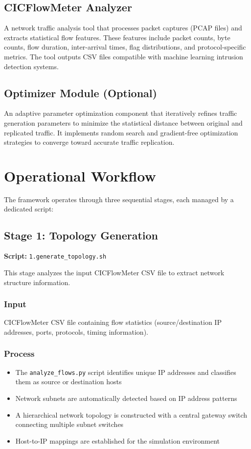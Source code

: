 \documentclass[11pt,a4paper]{article}
\begin{document}
\subsection{CICFlowMeter Analyzer}

A network traffic analysis tool that processes packet captures (PCAP files) and extracts statistical flow features. These features include packet counts, byte counts, flow duration, inter-arrival times, flag distributions, and protocol-specific metrics. The tool outputs CSV files compatible with machine learning intrusion detection systems.

\subsection{Optimizer Module (Optional)}

An adaptive parameter optimization component that iteratively refines traffic generation parameters to minimize the statistical distance between original and replicated traffic. It implements random search and gradient-free optimization strategies to converge toward accurate traffic replication.

\section{Operational Workflow}

The framework operates through three sequential stages, each managed by a dedicated script:

\subsection{Stage 1: Topology Generation}

\textbf{Script:} \texttt{1.generate\_topology.sh}

This stage analyzes the input CICFlowMeter CSV file to extract network structure information.

\subsubsection{Input}
CICFlowMeter CSV file containing flow statistics (source/destination IP addresses, ports, protocols, timing information).

\subsubsection{Process}
\begin{itemize}
    \item The \texttt{analyze\_flows.py} script identifies unique IP addresses and classifies them as source or destination hosts
    \item Network subnets are automatically detected based on IP address patterns
    \item A hierarchical network topology is constructed with a central gateway switch connecting multiple subnet switches
    \item Host-to-IP mappings are established for the simulation environment
\end{itemize}
\end{document}
